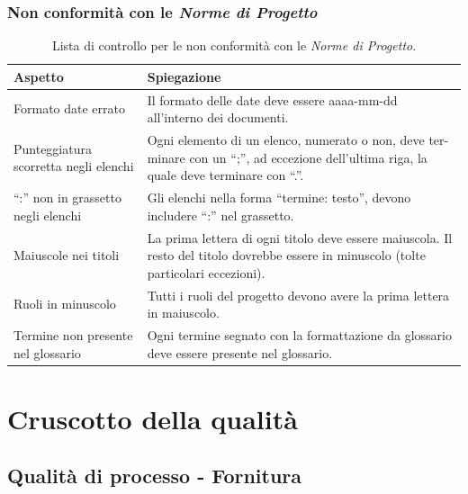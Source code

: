 \documentclass[8pt]{article}
\begin{document}
\subsubsection{Non conformità con le \textit{Norme di Progetto}}
\renewcommand{\arraystretch}{2.5}
\begin{longtable}{|>{\centering}p{5cm}|>{\centering\arraybackslash}p{10cm}|}
\hline
\rowcolor{white}
    \textbf{Aspetto} & \textbf{Spiegazione} \\
\hline
\endfirsthead
\rowcolor{white}
    \caption{Lista di controllo per le non conformità con le \textit {Norme di Progetto}.}
    \label{table: Lista di controllo per le non conformità con le Norme di Progetto}
\endlastfoot
    Formato date errato & Il formato delle date deve essere aaaa-mm-dd all’interno dei documenti. \\
    \hline
    Punteggiatura scorretta negli elenchi &  Ogni elemento di un elenco, numerato o non, deve ter-
    minare con un ``;”, ad eccezione dell’ultima riga, la quale deve terminare con ``.”. \\ 
    \hline
    ``:” non in grassetto negli elenchi & Gli elenchi nella forma ``termine: testo”, devono
    includere ``:” nel grassetto. \\
    \hline
    Maiuscole nei titoli & La prima lettera di ogni titolo deve essere maiuscola. Il resto del
    titolo dovrebbe essere in minuscolo (tolte particolari eccezioni). \\
    \hline
    Ruoli in minuscolo & Tutti i ruoli del progetto devono avere la prima lettera in maiuscolo. \\
    \hline
    Termine non presente nel glossario & Ogni termine segnato con la formattazione da glossario deve essere presente nel glossario. \\
\hline
\end{longtable}
\newpage
\section{Cruscotto della qualità}
\subsection{Qualità di processo - Fornitura}
\end{document}
